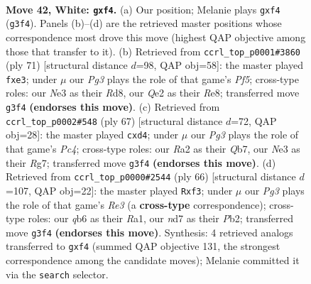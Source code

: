 \documentclass[11pt]{article}
\begin{document}
\clearpage

\begin{figure}[p]\centering
\begin{subfigure}{0.46\textwidth}\centering
\resizebox{\linewidth}{!}{%
\newchessgame
\chessboard[
  setfen={r4rk1/3n4/1q1p4/1P2b2p/p4p1P/P1p1N1P1/R3Q3/1NR3K1 w - - 0 42},
  showmover=false,
  pgfstyle=straightmove, color=movearrow, markmove={g3-f4}
]}
\caption{}
\end{subfigure}\hfill
\begin{subfigure}{0.46\textwidth}\centering
\resizebox{\linewidth}{!}{%
\newchessgame
\chessboard[
  setfen={3rr1k1/7p/5Qp1/3q2n1/Pp1P1p2/4PP2/6P1/B1R1R1K1 b - - 0 36},
  showmover=false,
  pgfstyle=straightmove, color=movearrow, markmove={f4-e3}
]}
\caption{}
\end{subfigure}
\\[4pt]
\begin{subfigure}{0.46\textwidth}\centering
\resizebox{\linewidth}{!}{%
\newchessgame
\chessboard[
  setfen={6k1/pq1n2r1/4p2Q/2p5/2PRP2p/2N3P1/Pr4PB/3R2K1 b - - 0 34},
  showmover=false,
  pgfstyle=straightmove, color=movearrow, markmove={c5-d4}
]}
\caption{}
\end{subfigure}\hfill
\begin{subfigure}{0.46\textwidth}\centering
\resizebox{\linewidth}{!}{%
\newchessgame
\chessboard[
  setfen={r1r3k1/4pp2/p2p3Q/1b1P1q2/7P/1N2Rp2/1P4P1/R6K w - - 0 34},
  showmover=false,
  pgfstyle=straightmove, color=movearrow, markmove={e3-f3}
]}
\caption{}
\end{subfigure}
\caption{\textbf{Move 42, White: \texttt{gxf4}.} (a) Our position; Melanie plays \texttt{gxf4} (\texttt{g3f4}). Panels (b)--(d) are the retrieved master positions whose correspondence most drove this move (highest QAP objective among those that transfer to it). (b) Retrieved from \texttt{ccrl\_top\_p0001\#3860} (ply 71) [structural distance $d$=98, QAP obj=58]: the master played \texttt{fxe3}; under $\mu$ our \emph{Pg3} plays the role of that game's \emph{Pf5}; cross-type roles: our \emph{N}e3 as their \emph{R}d8, our \emph{Q}e2 as their \emph{R}e8; transferred move \texttt{g3f4} \textbf{(endorses this move)}. (c) Retrieved from \texttt{ccrl\_top\_p0002\#548} (ply 67) [structural distance $d$=72, QAP obj=28]: the master played \texttt{cxd4}; under $\mu$ our \emph{Pg3} plays the role of that game's \emph{Pc4}; cross-type roles: our \emph{R}a2 as their \emph{Q}b7, our \emph{N}e3 as their \emph{R}g7; transferred move \texttt{g3f4} \textbf{(endorses this move)}. (d) Retrieved from \texttt{ccrl\_top\_p0000\#2544} (ply 66) [structural distance $d$=107, QAP obj=22]: the master played \texttt{Rxf3}; under $\mu$ our \emph{Pg3} plays the role of that game's \emph{Re3} (a \textbf{cross-type} correspondence); cross-type roles: our \emph{q}b6 as their \emph{R}a1, our \emph{n}d7 as their \emph{P}b2; transferred move \texttt{g3f4} \textbf{(endorses this move)}. Synthesis: 4 retrieved analogs transferred to \texttt{gxf4} (summed QAP objective 131, the strongest correspondence among the candidate moves); Melanie committed it via the \texttt{search} selector.}
\label{fig:thought-m82}
\end{figure}
\end{document}
